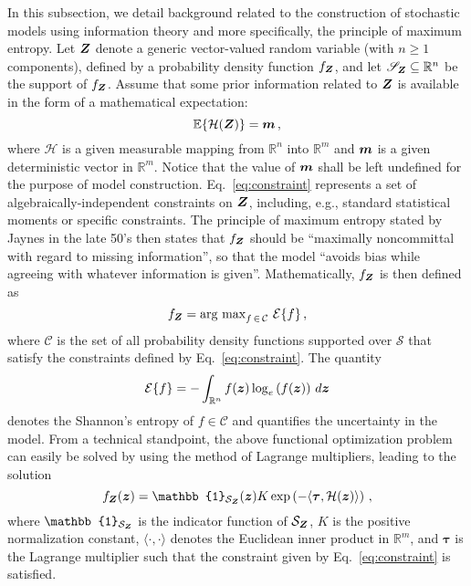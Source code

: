 In this subsection, we detail background related to the construction of stochastic models using information theory and more specifically, the principle of maximum entropy. Let $\boldsymbol{Z}$ denote a generic vector-valued random variable (with $n \geq 1$ components), defined by a probability density function $f_{\boldsymbol{Z}}$, and let $\mathscr{S}_{\boldsymbol{Z}} \subseteq \mathbb{R}^n$ be the support of $f_{\boldsymbol{Z}}$. Assume that some prior information related to $\boldsymbol{Z}$ is available in the form of a mathematical expectation:
\begin{equation}
    \mathbb{E}\{\mathcal{H}(\boldsymbol{Z})\} = \boldsymbol{m}\,, \label{eq:constraint}
\end{equation}
where $\mathcal{H}$ is a given measurable mapping from $\mathbb{R}^n$ into $\mathbb{R}^m$ and $\boldsymbol{m}$ is a given deterministic vector in $\mathbb{R}^m$. Notice that the value of $\boldsymbol{m}$ shall be left undefined for the purpose of model construction. Eq.~\eqref{eq:constraint} represents a set of algebraically-independent constraints on $\boldsymbol{Z}$, including, e.g., standard statistical moments or specific constraints. The principle of maximum entropy stated by Jaynes in the late 50's \cite{Jaynes1957a,Jaynes1957b} then states that $f_{\boldsymbol{Z}}$ should be ``maximally noncommittal with regard to missing information'', so that the model ``avoids bias while agreeing with whatever information is given''. Mathematically, $f_{\boldsymbol{Z}}$ is then defined as
\begin{equation}
    f_{\boldsymbol{Z}} = \text{arg max}_{f\,\in\,\mathcal{C}}~\mathcal{E}\{f\}\,,
\end{equation}
where $\mathcal{C}$ is the set of all probability density functions supported over $\mathcal{S}$ that satisfy the constraints defined by Eq.~\eqref{eq:constraint}. The quantity 
\begin{equation}
    \mathcal{E}\{f\} = - \int_{\mathbb{R}^n} f(\boldsymbol{z}) \log_e \left(f(\boldsymbol{z})\right)\,d\boldsymbol{z}
\end{equation}
denotes the Shannon's entropy of $f \in \mathcal{C}$ and quantifies the uncertainty in the model. From a technical standpoint, the above functional optimization problem can easily be solved by using the method of Lagrange multipliers, leading to the solution
\begin{equation}
    f_{\bfZ}(\bfz) = \mathbb{1}_{\mathcal{S}_{\bfZ}}(\bfz) K \exp \left( - \langle \boldsymbol{\tau}, \mathcal{H}(\bfz) \rangle \right)\,,
\end{equation}
where $\mathbb{1}_{\mathcal{S}_{\bfZ}}$ is the indicator function of $\mathcal{S}_{\boldsymbol{Z}}$, $K$ is the positive normalization constant, $\langle \cdot, \cdot \rangle$ denotes the Euclidean inner product in $\mathbb{R}^m$, and $\boldsymbol{\tau}$ is the Lagrange multiplier such that the constraint given by Eq.~\eqref{eq:constraint} is satisfied. 

